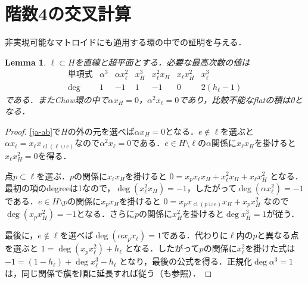 \documentclass[12pt]{amsart}
\newtheorem{lem}[thm]{Lemma}
\theoremstyle{definition}
\theoremstyle{remark}
\numberwithin{equation}{section}
\begin{document}
\section{階数4の交叉計算}
非実現可能なマトロイドにも通用する環の中での証明を与える．
\begin{lem}\label{ja-monomials}
$\ell\subset H$を直線と超平面とする．必要な最高次数の値は
\[
\begin{array}{c|rrrrrr}
\text{単項式}&\alpha^3&\alpha x_\ell^2&x_H^3&x_\ell^2x_H&x_\ell x_H^2&x_\ell^3\\\hline
\deg&1&-1&1&-1&0&2(h_\ell-1)
\end{array}
\]
である．またChow環の中で$\alpha x_H=0$，$\alpha^2x_\ell=0$であり，比較不能なflatの積は0となる．
\end{lem}
\begin{proof}
\eqref{ja-ab}で$H$の外の元を選べば$\alpha x_H=0$となる．$e\notin\ell$を選ぶと$\alpha x_\ell=x_\ell x_{\operatorname{cl}(\ell\cup e)}$なので$\alpha^2x_\ell=0$である．$e\in H\setminus\ell$の$\alpha$関係に$x_\ell x_H$を掛けると$x_\ell x_H^2=0$を得る．

点$p\subset\ell$を選ぶ．$p$の関係に$x_\ell x_H$を掛けると
$0=x_px_\ell x_H+x_\ell^2x_H+x_\ell x_H^2$
となる．最初の項のdegreeは1なので，$\deg(x_\ell^2x_H)=-1$，したがって$\deg(\alpha x_\ell^2)=-1$である．$e\in H\setminus p$の関係に$x_px_H$を掛けると
$0=x_px_{\operatorname{cl}(p\cup e)}x_H+x_px_H^2$
なので$\deg(x_px_H^2)=-1$となる．さらに$p$の関係に$x_H^2$を掛けると$\deg x_H^3=1$が従う．

最後に，$e\notin\ell$を選べば$\deg(\alpha x_px_\ell)=1$である．代わりに$\ell$内の$p$と異なる点を選ぶと
$1=\deg(x_px_\ell^2)+h_\ell$
となる．したがって$p$の関係に$x_\ell^2$を掛けた式は
$-1=(1-h_\ell)+\deg x_\ell^3-h_\ell$
となり，最後の公式を得る．正規化$\deg\alpha^3=1$は，同じ関係で旗を順に延長すれば従う（\cite[Proposition 5.8]{AHK}も参照）．
\end{proof}
\end{document}
